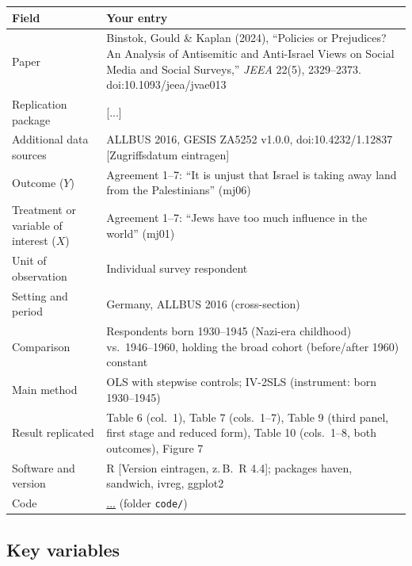 \documentclass[12pt,a4paper]{article}
\renewcommand{\arraystretch}{1.25}
\begin{document}
{\renewcommand{\arraystretch}{1.4}%
\begin{tabularx}{\textwidth}{@{}>{\raggedright\arraybackslash}p{}L@{}}
\toprule
Field & Your entry \\
\midrule
Paper & Binstok, Gould \& Kaplan (2024), ``Policies or Prejudices? An Analysis of Antisemitic and Anti-Israel Views on Social Media and Social Surveys,'' \textit{JEEA} 22(5), 2329--2373. doi:10.1093/jeea/jvae013 \\
Replication package & [...] \\
Additional data sources & ALLBUS 2016, GESIS ZA5252 v1.0.0, doi:10.4232/1.12837 [Zugriffsdatum eintragen] \\
Outcome ($Y$) & Agreement 1--7: ``It is unjust that Israel is taking away land from the Palestinians'' (mj06) \\
Treatment or variable of interest ($X$) & Agreement 1--7: ``Jews have too much influence in the world'' (mj01) \\
Unit of observation & Individual survey respondent \\
Setting and period & Germany, ALLBUS 2016 (cross-section) \\
Comparison & Respondents born 1930--1945 (Nazi-era childhood) vs.\ 1946--1960, holding the broad cohort (before/after 1960) constant \\
Main method & OLS with stepwise controls; IV-2SLS (instrument: born 1930--1945) \\
Result replicated & Table 6 (col.\ 1), Table 7 (cols.\ 1--7), Table 9 (third panel, first stage and reduced form), Table 10 (cols.\ 1--8, both outcomes), Figure 7 \\
Software and version & R [Version eintragen, z.\,B.\ R 4.4]; packages haven, sandwich, ivreg, ggplot2 \\
Code & \url{...} (folder \texttt{code/}) \\
\bottomrule
\end{tabularx}}

\subsection{Key variables}
\end{document}
